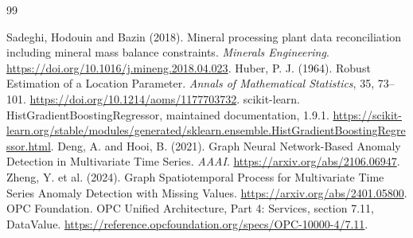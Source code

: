 \begin{thebibliography}{99}
\small\raggedright
{} Sadeghi, Hodouin and Bazin (2018). Mineral processing plant data reconciliation including mineral mass balance constraints. \emph{Minerals Engineering}. \url{https://doi.org/10.1016/j.mineng.2018.04.023}.
 Huber, P. J. (1964). Robust Estimation of a Location Parameter. \emph{Annals of Mathematical Statistics}, 35, 73--101. \url{https://doi.org/10.1214/aoms/1177703732}.
 scikit-learn. HistGradientBoostingRegressor, maintained documentation, 1.9.1. \url{https://scikit-learn.org/stable/modules/generated/sklearn.ensemble.HistGradientBoostingRegressor.html}.
 Deng, A. and Hooi, B. (2021). Graph Neural Network-Based Anomaly Detection in Multivariate Time Series. \emph{AAAI}. \url{https://arxiv.org/abs/2106.06947}.
 Zheng, Y. et al. (2024). Graph Spatiotemporal Process for Multivariate Time Series Anomaly Detection with Missing Values. \url{https://arxiv.org/abs/2401.05800}.
 OPC Foundation. OPC Unified Architecture, Part 4: Services, section 7.11, DataValue. \url{https://reference.opcfoundation.org/specs/OPC-10000-4/7.11}.
\end{thebibliography}
